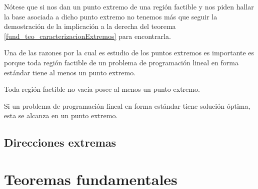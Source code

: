 \begin{obs}
	Nótese que si nos dan un punto extremo de una región factible y nos piden hallar la base asociada a dicho punto extremo no tenemos más que seguir la demostración de la implicación a la derecha del teorema \ref{fund_teo_caracterizacionExtremos} para encontrarla.
\end{obs}
Una de las razones por la cual es estudio de los puntos extremos es importante es porque toda región factible de un problema de programación lineal en forma estándar tiene al menos un punto extremo.
\begin{theo}[Existencia]
	Toda región factible no vacía posee al menos un punto extremo.
\end{theo}
\begin{theo}[Optimalidad]
	Si un problema de programación lineal en forma estándar tiene solución óptima, esta se alcanza en un punto extremo.
\end{theo}
\subsection{Direcciones extremas}
\section{Teoremas fundamentales}